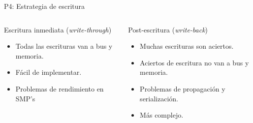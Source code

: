 \begin{frame}[t]{P4: Estrategia de escritura}
\begin{columns}[T]

\begin{column}{.5\textwidth}
\begin{block}{Escritura inmediata (\emph{write-through})}
\begin{itemize}
  \item Todas las escrituras van a bus y memoria.
  \item Fácil de implementar.
  \item Problemas de rendimiento en SMP’s
\end{itemize}
\end{block}
\end{column}

\pause
\begin{column}{.5\textwidth}
\begin{block}{Post-escritura (\emph{write-back})}
\begin{itemize}
  \item Muchas escrituras son aciertos.
  \item Aciertos de escritura \alert{no} van a bus y memoria.
  \item Problemas de propagación y serialización.
  \item Más complejo.
\end{itemize}
\end{block}
\end{column}

\end{columns}
\end{frame}

